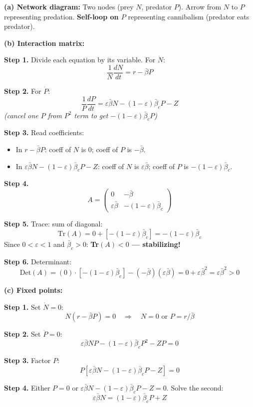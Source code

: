 \documentclass[10pt]{article}
\newcommand{\thus}{\quad\Longrightarrow\quad}
\newcommand{\stepwhy}[1]{\textcolor{blue!60!black}{\small\textit{(#1)}}}
\begin{document}
\begin{solution}
\textbf{(a) Network diagram:} Two nodes (prey $N$, predator $P$). Arrow from $N$ to $P$ representing predation. \textbf{Self-loop on $P$} representing cannibalism (predator eats predator).

\medskip\textbf{(b) Interaction matrix:}

\textbf{Step 1.} Divide each equation by its variable. For $\dot N$:
\[
\frac{1}{N}\frac{dN}{dt} = r - \bar\beta P
\]

\textbf{Step 2.} For $\dot P$:
\[
\frac{1}{P}\frac{dP}{dt} = \varepsilon\bar\beta N - (1-\varepsilon)\bar\beta_c P - Z
\]
\stepwhy{cancel one $P$ from $P^2$ term to get $-(1-\varepsilon)\bar\beta_c P$}

\textbf{Step 3.} Read coefficients:
\begin{itemize}
\item In $r - \bar\beta P$: coeff of $N$ is 0; coeff of $P$ is $-\bar\beta$.
\item In $\varepsilon\bar\beta N - (1-\varepsilon)\bar\beta_c P - Z$: coeff of $N$ is $\varepsilon\bar\beta$; coeff of $P$ is $-(1-\varepsilon)\bar\beta_c$.
\end{itemize}

\textbf{Step 4.}
\[
A = \begin{pmatrix} 0 & -\bar\beta \\ \varepsilon\bar\beta & -(1-\varepsilon)\bar\beta_c \end{pmatrix}
\]

\textbf{Step 5.} Trace: sum of diagonal:
\[
\text{Tr}(A) = 0 + [-(1-\varepsilon)\bar\beta_c] = -(1-\varepsilon)\bar\beta_c
\]
Since $0 < \varepsilon < 1$ and $\bar\beta_c > 0$: \textbf{Tr$(A) < 0$ — stabilizing!}

\textbf{Step 6.} Determinant:
\[
\text{Det}(A) = (0)\cdot[-(1-\varepsilon)\bar\beta_c] - (-\bar\beta)(\varepsilon\bar\beta) = 0 + \varepsilon\bar\beta^2 = \varepsilon\bar\beta^2 > 0
\]

\medskip\textbf{(c) Fixed points:}

\textbf{Step 1.} Set $\dot N = 0$:
\[
N(r - \bar\beta P) = 0 \thus N = 0 \text{ or } P = r/\bar\beta
\]

\textbf{Step 2.} Set $\dot P = 0$:
\[
\varepsilon\bar\beta NP - (1-\varepsilon)\bar\beta_c P^2 - ZP = 0
\]

\textbf{Step 3.} Factor $P$:
\[
P[\varepsilon\bar\beta N - (1-\varepsilon)\bar\beta_c P - Z] = 0
\]

\textbf{Step 4.} Either $P = 0$ or $\varepsilon\bar\beta N - (1-\varepsilon)\bar\beta_c P - Z = 0$. Solve the second:
\[
\varepsilon\bar\beta N = (1-\varepsilon)\bar\beta_c P + Z
\]


\end{solution}
\end{document}
